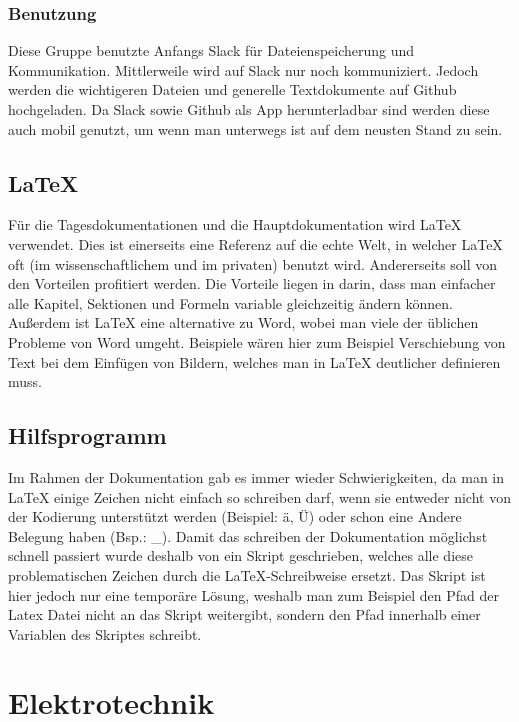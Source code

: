 \documentclass[notitlepage]{report}
\begin{document}
\subsubsection{Benutzung}

Diese Gruppe benutzte Anfangs Slack f\"{u}r Dateienspeicherung und Kommunikation. Mittlerweile wird auf Slack nur noch kommuniziert. Jedoch werden die wichtigeren Dateien und generelle Textdokumente auf Github hochgeladen. Da Slack sowie Github als App herunterladbar sind werden  diese auch mobil genutzt, um wenn man unterwegs ist auf dem neusten Stand zu sein. 

\subsection{\LaTeX}

F\"{u}r die Tagesdokumentationen und die Hauptdokumentation wird LaTeX verwendet. Dies ist einerseits eine Referenz auf die echte Welt, in welcher LaTeX oft (im wissenschaftlichem und im privaten) benutzt wird. Andererseits soll von den Vorteilen profitiert werden. Die Vorteile liegen in darin, dass man einfacher alle Kapitel, Sektionen und Formeln variable gleichzeitig \"{a}ndern k\"{o}nnen. Au{\ss}erdem ist LaTeX eine alternative zu Word, wobei man viele der \"{u}blichen Probleme von Word umgeht. Beispiele w\"{a}ren hier zum Beispiel Verschiebung von Text bei dem Einf\"{u}gen von Bildern, welches man in LaTeX deutlicher definieren muss. 

\subsection{Hilfsprogramm}

Im Rahmen der Dokumentation gab es immer wieder Schwierigkeiten, da man in LaTeX einige Zeichen nicht einfach so schreiben darf, wenn sie entweder nicht von der Kodierung unterst\"{u}tzt werden (Beispiel: \"{a}, \"{U}) oder schon eine Andere Belegung haben (Bsp.: \_). Damit das schreiben der Dokumentation m\"{o}glichst schnell passiert wurde deshalb von ein Skript geschrieben, welches alle diese problematischen Zeichen durch die LaTeX-Schreibweise ersetzt. Das Skript ist hier jedoch nur eine tempor\"{a}re L\"{o}sung, weshalb man zum Beispiel den Pfad der Latex Datei nicht an das Skript weitergibt, sondern den Pfad innerhalb einer Variablen des Skriptes schreibt.

\section{Elektrotechnik}
\end{document}

